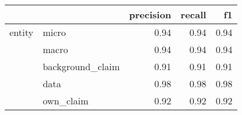 \begin{tabular}{llrrr}
\toprule
       &           &  precision &  recall &   f1 \\
\midrule
entity & micro &       0.94 &    0.94 & 0.94 \\
       & macro &       0.94 &    0.94 & 0.94 \\
       & background\_claim &       0.91 &    0.91 & 0.91 \\
       & data &       0.98 &    0.98 & 0.98 \\
       & own\_claim &       0.92 &    0.92 & 0.92 \\
\bottomrule
\end{tabular}

